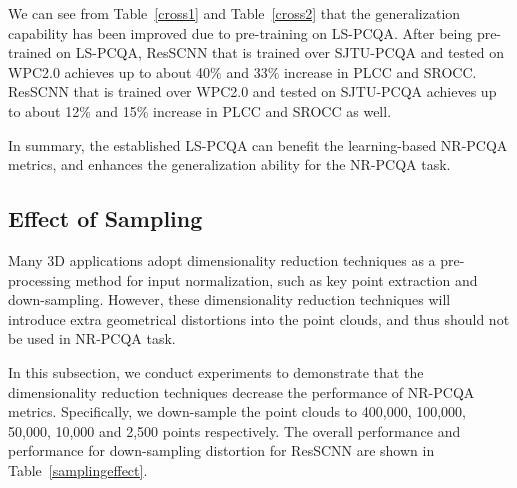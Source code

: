 \documentclass[acmsmall]{acmart}
\begin{document}
\par We can see from Table~\ref{cross1} and Table~\ref{cross2} that the generalization capability has been improved due to pre-training on LS-PCQA. After being pre-trained on LS-PCQA, ResSCNN that is trained over SJTU-PCQA and tested on WPC2.0 achieves up to about 40\% and 33\% increase in PLCC and SROCC. ResSCNN that is trained over WPC2.0 and tested on SJTU-PCQA achieves up to about 12\% and 15\% increase in PLCC and SROCC as well.

\par In summary, the established LS-PCQA can benefit the learning-based NR-PCQA metrics, and enhances the generalization ability for the NR-PCQA task.


\subsection{Effect of Sampling}

\par Many 3D applications adopt dimensionality reduction techniques as a pre-processing method for input normalization, such as key point extraction and down-sampling. However, these dimensionality reduction techniques will introduce extra geometrical distortions into the point clouds, and thus should not be used in NR-PCQA task.
\par In this subsection, we conduct experiments to demonstrate that the dimensionality reduction techniques decrease the performance of NR-PCQA metrics. Specifically, we down-sample the point clouds to 400,000, 100,000, 50,000, 10,000 and 2,500 points respectively. The overall performance and performance for down-sampling distortion for ResSCNN are shown in Table~\ref{samplingeffect}.
\end{document}
